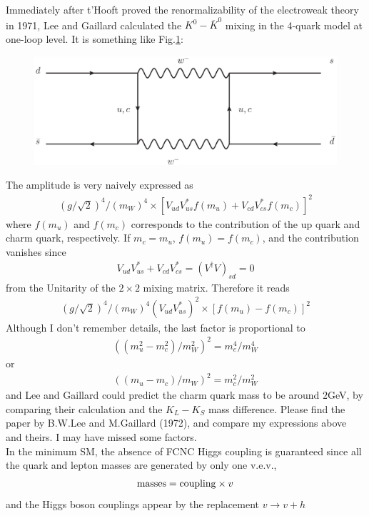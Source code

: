 \documentclass[12pt]{article}
\begin{document}
  Immediately after t'Hooft proved the renormalizability of the
  electroweak theory in 1971, Lee and Gaillard calculated the $K^0-{\overline K^0}$ mixing in the 4-quark model at one-loop level. It is something like Fig.\ref{fig.101}:
  \begin{figure}[htb]
    \centering
    \includegraphics[scale=0.6]{hw10.eps}
    \caption{ }\label{fig.101}
  \end{figure}
  The amplitude is very naively expressed as
\begin{eqnarray}
  (g/\sqrt{2})^4/(m_W)^4 \times [ V_{ud} V_{us}^* f(m_u) + V_{cd} V_{cs}^* f(m_c) ]^2
\end{eqnarray}
  where $f(m_u)$ and $f(m_c)$ corresponds to the contribution of the up quark
  and charm quark, respectively.  If $m_c=m_u$, $f(m_u) = f(m_c)$, and the
  contribution vanishes since
\begin{eqnarray}
  V_{ud} V_{us}^* + V_{cd} V_{cs}^* = (V^\dagger V)_{sd} = 0
\end{eqnarray}
   from the Unitarity of the $2 \times 2$ mixing matrix.  Therefore it reads
\begin{eqnarray}
  (g/\sqrt{2})^4/(m_W)^4 (V_{ud} V_{us}^*)^2 \times [ f(m_u) - f(m_c) ]^2
\end{eqnarray}
  Although I don't remember details, the last factor is proportional to
\begin{eqnarray}
  ((m_u^2 - m_c^2)/m_W^2)^2 = m_c^4/m_W^4
\end{eqnarray}
  or
\begin{eqnarray}
  ((m_u - m_c)/m_W)^2 = m_c^2/m_W^2
\end{eqnarray}
  and Lee and Gaillard could predict the charm quark mass to be around
  $2$GeV, by comparing their calculation and the $K_L-K_S$ mass difference.
  Please find the paper by B.W.Lee and M.Gaillard (1972), and compare
  my expressions above and theirs. I may have missed some factors.\\


  In the minimum SM, the absence of FCNC Higgs coupling is guaranteed
  since all the quark and lepton masses are generated by only one v.e.v.,
\begin{eqnarray}
  {\rm masses} = {\rm coupling} \times v
\end{eqnarray}
  and the Higgs boson couplings appear by the replacement $v \to v+h$
\end{document}
